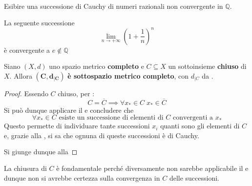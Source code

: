 \begin{exercise}
	Esibire una successione di Cauchy di numeri razionali non convergente in $\mathbb{Q}$.
	\begin{solution}
		La seguente successione
		\[\lim\limits_{n \to +\infty} \left( 1+ \frac{1}{n} \right)^n\]
		è convergente a $e \notin \mathbb{Q}$
	\end{solution}
\end{exercise}
\begin{proposition}
	\label{prop:subset_compl_e_compl}
	Siano $(X,d)$ uno spazio metrico \textbf{completo} e $C \subseteq X$ un sottoinsieme \textbf{chiuso} di $X$. Allora $\boldsymbol{(C,d_{|C})}$ \textbf{è sottospazio metrico completo}, con $d_{|C}$ da .
	\begin{proof}
		Essendo $C$ chiuso, per :
		\[C = \overline{C} \implies \forall x_* \in C\; x_* \in \overline{C}\]
		Si può dunque applicare il  e concludere che
		\[\forall x_* \in C \text{ esiste un successione di elementi di $C$ convergenti a $x_*$}\]
		Questo permette di individuare tante successioni $x_i$ quanti sono gli elementi di $C$ e, grazie alla , si sa che ognuna di queste successioni è di Cauchy.

		Si giunge dunque alla 
	\end{proof}
	\begin{note}
		La chiusura di $C$ è fondamentale perché diversamente non sarebbe applicabile il  e dunque non si avrebbe certezza sulla convergenza in $C$ delle successioni.
	\end{note}
\end{proposition}
